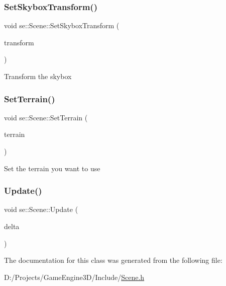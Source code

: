 \subsubsection{\texorpdfstring{Set\+Skybox\+Transform()}{SetSkyboxTransform()}}
{\footnotesize\ttfamily void se\+::\+Scene\+::\+Set\+Skybox\+Transform (\begin{DoxyParamCaption}\item[{\mbox{\hyperlink{classse_1_1_transform3f}{Transform3f}} $\ast$}]{transform }\end{DoxyParamCaption})}

Transform the skybox \mbox{\label{classse_1_1_scene_ac8fddc56bc7f1385d640f24e75ea41d6}} 
\subsubsection{\texorpdfstring{Set\+Terrain()}{SetTerrain()}}
{\footnotesize\ttfamily void se\+::\+Scene\+::\+Set\+Terrain (\begin{DoxyParamCaption}\item[{\mbox{\hyperlink{classse_1_1_abstract_terrain}{Abstract\+Terrain}} $\ast$}]{terrain }\end{DoxyParamCaption})}

Set the terrain you want to use \mbox{\label{classse_1_1_scene_acdc3858f5d4fd76cf9a712a02218341a}} 
\subsubsection{\texorpdfstring{Update()}{Update()}}
{\footnotesize\ttfamily void se\+::\+Scene\+::\+Update (\begin{DoxyParamCaption}\item[{float}]{delta }\end{DoxyParamCaption})}



The documentation for this class was generated from the following file\+:\begin{DoxyCompactItemize}
\item 
D\+:/\+Projects/\+Game\+Engine3\+D/\+Include/\mbox{\hyperlink{_scene_8h}{Scene.\+h}}\end{DoxyCompactItemize}
